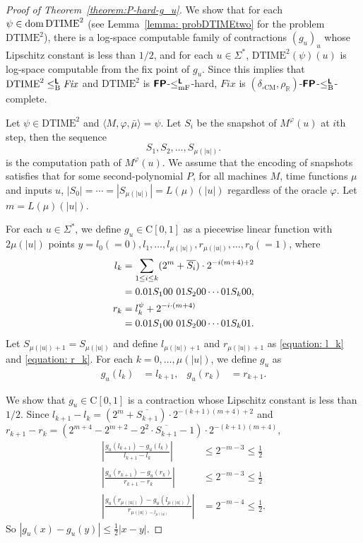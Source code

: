\documentclass[envcountsect,envcountsame,orivec,oribibl]{llncs}
\newcommand{\R}{\mathbb R}
\newcommand{\classtwofont}[1]{\text{\bfseries \sffamily \upshape #1}}
\newcommand{\classLtwo}{\classtwofont{L}}
\newcommand{\classFPtwo}{\classtwofont{FP}}
\newcommand{\deltaboxCM}{\delta _{\square \mathrm{CM}}}
\newcommand{\rhoR}{\rho _\R}
\newcommand{\redmF}{\leq _{\mathrm{mF}}}
\newcommand{\redB}{\leq _{\mathrm B}}
\newcommand{\redLmF}{\redmF ^{\classLtwo}}
\newcommand{\redLB}{\redB ^{\classLtwo}}
\newcommand{\classC}{\mathrm C}
\newcommand{\OpCMFix}{\mathit{Fix}}
\newcommand{\probDTIMEtwo}{\mathrm{DTIME}^2}
\newcommand{\dom}{\mathop{\rm dom}}
\begin{document}
\begin{proof}[Proof of Theorem~\ref{theorem:P-hard-g_u}]
 We show that for each $\psi \in \dom \probDTIMEtwo$
 (see Lemma~\ref{lemma: probDTIMEtwo} for the problem $\probDTIMEtwo$),
 there is a log-space computable family of contractions $(g_u)_u$ whose
 Lipschitz constant is less than $1/2$,
 and for each $u \in \varSigma^*$, $\probDTIMEtwo(\psi)(u)$ is log-space 
 computable from the fix point of $g_u$.
 Since this implies that $\probDTIMEtwo \redLB \OpCMFix$ and $\probDTIMEtwo$
 is $\classFPtwo$-$\redLmF$-hard, $\OpCMFix$ is 
 $(\deltaboxCM, \rhoR)$-$\classFPtwo$-$\redLB$-complete.

 Let $\psi \in \probDTIMEtwo$ and $\langle M, \varphi, \bar \mu \rangle = \psi$.
 Let $S_i$ be the snapshot of $M^\varphi(u)$ at $i$th step, then the sequence
 \begin{equation}
  S_1, S_2, \dots, S_{\mu(|u|)}.
 \end{equation}
 is the computation path of $M^\varphi(u)$.
 We assume that the encoding of snapshots satisfies that 
 for some second-polynomial $P$, for all machines $M$, time functions $\mu$ 
 and inputs $u$, $|S_0| = \cdots = |S_{\mu(|u|)}| = L(\mu)(|u|)$
 regardless of the oracle $\varphi$.
 Let $m = L(\mu)(|u|)$.


 For each $u \in \varSigma^*$, we define $g_u \in \classC[0,1]$ as
 a piecewise linear function with $2\mu(|u|)$ points
 $y = l_0 (=0), l_1, \dots, l_{\mu(|u|)}, r_{\mu(|u|)}, \dots, r_0(=1)$,
 where
\begin{alignat}{2}
 \label{equation: l_k}
 l_k 
 &
 = \sum_{1 \le i \le k} (2^m+\overline{S_i}) \cdot 2^{-i(m+4)+2} 
\notag
 \\
 &
 = 0.01S_100\ 01S_200 \cdots 01S_k00,
 \\
 \label{equation: r_k}
 r_k
 &
 = l^\psi_k + 2^{-i \cdot (m+4)}
\notag
 \\
 &
 = 0.01S_100\ 01S_200 \cdots 01S_k01.
\end{alignat}
 Let $S_{\mu(|u|)+1} = S_{\mu(|u|)}$ and
 define $l_{\mu(|u|)+1}$ and $r_{\mu(|u|)+1}$ as
 \eqref{equation: l_k} and \eqref{equation: r_k}.
 For each $k = 0, \dots, \mu(|u|)$,
 we define $g_u$ as
 \begin{align}
 g_u(l_k) &= l_{k+1},
 &
 g_u(r_k) &= r_{k+1}.
 \end{align}

 We show that $g_u \in \classC[0,1]$ is a contraction whose Lipschitz constant
 is less than $1/2$.
 Since $l_{k+1} - l_{k} = (2^m+\overline{S_{k+1}}) \cdot 2^{-(k+1)(m+4)+2} $
 and $r_{k+1} - r_{k} = (2^{m+4} - 2^{m+2} - 2^2 \cdot \overline{S_{k+1}} - 1)
 \cdot 2^{-(k+1)(m+4)} $,
\begin{align}
 \left|\frac{g_u(l_{k+1}) - g_u(l_k)}{l_{k+1} - l_k} \right| 
 &
 \le 2^{-m-3} \le \frac 1 2
 \\
 \left|\frac{g_u(r_{k+1}) - g_u(r_k)}{r_{k+1} - r_k} \right| 
 &
 \le 2^{-m-3} \le \frac 1 2
 \\
 \left|\frac{g_u(r_{\mu(|u|)}) - g_u(l_{\mu(|u|)})}{r_{\mu(|u|) - l_{\mu(|u|)}}} \right| 
 &
 = 2^{-m-4} \le \frac 1 2.
\end{align}
 So $|g_u(x) - g_u(y)| \le \frac 1 2 |x-y|$.


\end{proof}
\end{document}
